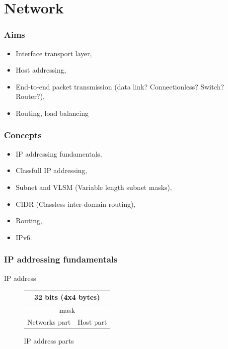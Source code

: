   \section{Network}
  \begin{frame}
    \frametitle{Aims}
      \begin{itemize}
        \item Interface transport layer,
	\item Host addressing,
        \item End-to-end packet transmission (data link? Connectionless? Switch? Router?),
        \item Routing, load balancing
      \end{itemize}
  \end{frame}
  \begin{frame}
    \frametitle{Concepts}
      \begin{itemize}
        \item IP addressing fundamentals,
        \item Classfull IP addressing,
        \item Subnet and VLSM (Variable length subnet masks),
        \item CIDR (Classless inter-domain routing),
        \item Routing,
        \item IPv6.
      \end{itemize}
  \end{frame}

  \begin{frame}
    \frametitle{IP addressing fundamentals}
    \begin{block}{IP address}
      \begin{figure}
        \centering
        \begin{tabular}{|c|c|}
          \multicolumn{2}{c}{32 bits (4x4 bytes)} \\ \hline
           \multicolumn{2}{|c|}{\color{brown}mask} \\ \hline
          \color{ForestGreen}Networks part & \color{blue}Host part \\ \hline
        \end{tabular}
        \caption{IP address parts}
        \label{fig:inside_ip_address}
      \end{figure}
    \end{block}
  \end{frame}

